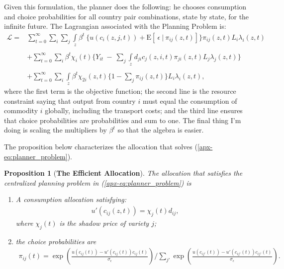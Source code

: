 \documentclass[12pt,pdftex]{article}
\newtheorem{prp}{Proposition}
\begin{document}
\begin{onehalfspacing}
Given this formulation, the planner does the following: he chooses consumption and choice probabilities for all country pair combinations, state by state, for the infinite future. The Lagrangian associated with the Planning Problem is:
\begin{align}
\mathcal{L}  = & \sum_{t=0}^{\infty}   \sum_{i} \sum_{j} \int\limits_{z}  \beta^{t} \  \bigg \{  u(c_{i}(z, j, t) ) + \mathrm{E}[ \ \epsilon \ | \ \pi_{ij}(z,t) ] \bigg \}\pi_{ij}(z,t) L_{i} \lambda_{i}(z, t) \label{apx-eq:planner_problem} \\
\nonumber \\
&+ \sum_{t=0}^{\infty} \sum_{i} \beta^{t} \chi_{i}(t) \bigg \{ Y_{it} \  - \ \sum_{j} \int\limits_{z}  d_{ji} c_{j}(z, i, t) \pi_{ji}(z,t) L_{j}\lambda_{j}(z, t) \bigg \} \nonumber \\
\nonumber \\
&+ \sum_{t=0}^{\infty} \sum_{i} \int\limits_{z}  \beta^{t} \chi_{2i}(z,t) \bigg \{1 - \sum_{j}\pi_{ij}(z,t) \bigg \} L_{i} \lambda_{i}(z, t), \nonumber
\end{align}
where the first term is the objective function; the second line is the resource constraint saying that output from country $i$ must equal the consumption of commodity $i$ globally, including the transport costs; and the third line ensures that choice probabilities are probabilities and sum to one. The final thing I'm doing is scaling the multipliers by $\beta^t$ so that the algebra is easier.

The proposition below characterizes the allocation that solves (\ref{apx-eq:planner_problem}).
\begin{prp}[\textbf{The Efficient Allocation}]\label{apx-prp:efficient-allocation} The allocation that satisfies the centralized planning problem in (\ref{apx-eq:planner_problem}) is
\begin{enumerate}
\item A consumption allocation satisfying:
\begin{align}
 u'(c_{ij}(z,t) ) = \chi_{j}(t) d_{ij},
\end{align}
where $\chi_{j}(t)$ is the shadow price of variety $j$;
\item the choice probabilities are
\begin{align}
\pi_{ij}(t) =\exp \left( \frac{u(c_{ij}(t)) - u'(c_{ij}(t))c_{ij}(t)}{\sigma_{\epsilon}}\right) \bigg / \sum_{j'}\exp \left( \frac{u(c_{ij'}(t)) - u'(c_{ij'}(t))c_{ij'}(t)}{\sigma_{\epsilon}} \right).
\label{apx-eq:planner-choice-prob}
\end{align}
\end{enumerate}
\end{prp}


\end{onehalfspacing}
\end{document}
